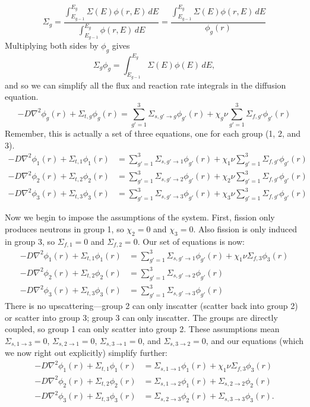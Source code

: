 \documentclass{report}
\begin{document}
\begin{enumerate}[a)]
$$ \Sigma_g = \frac{\int_{E_{g-1}}^{E_g} \Sigma(E)\phi(r,E)\,dE}{\int_{E_{g-1}}^{E_g} \phi(r,E)\,dE} = \frac{\int_{E_{g-1}}^{E_g} \Sigma(E)\phi(r,E)\,dE}{\phi_g(r)} $$
Multiplying both sides by $\phi_g$ gives
$$ \Sigma_g \phi_g = \int_{E_{g-1}}^{E_g} \Sigma(E)\phi(E)\,dE ,$$
and so we can simplify all the flux and reaction rate integrals in the diffusion equation.
$$ -D \nabla^2 \phi_g(r) + \Sigma_{t,g} \phi_g(r) = \sum_{g'=1}^3 \Sigma_{s,g' \rightarrow g}\phi_{g'}(r) + \chi_g \nu \sum_{g'=1}^3 \Sigma_{f,g'}\phi_{g'}(r) $$
Remember, this is actually a set of three equations, one for each group (1, 2, and 3).
\begin{align*}
-D \nabla^2 \phi_1(r) + \Sigma_{t,1} \phi_1(r) &= \sum_{g'=1}^3 \Sigma_{s,g' \rightarrow 1}\phi_{g'}(r) + \chi_1 \nu \sum_{g'=1}^3 \Sigma_{f,g'}\phi_{g'}(r) \\
-D \nabla^2 \phi_2(r) + \Sigma_{t,2} \phi_2(r) &= \sum_{g'=1}^3 \Sigma_{s,g' \rightarrow 2}\phi_{g'}(r) + \chi_2 \nu \sum_{g'=1}^3 \Sigma_{f,g'}\phi_{g'}(r) \\
-D \nabla^2 \phi_3(r) + \Sigma_{t,3} \phi_3(r) &= \sum_{g'=1}^3 \Sigma_{s,g' \rightarrow 3}\phi_{g'}(r) + \chi_3 \nu \sum_{g'=1}^3 \Sigma_{f,g'}\phi_{g'}(r)
\end{align*}

Now we begin to impose the assumptions of the system. First, fission only produces neutrons in group 1, so $\chi_2 = 0$ and $\chi_3 = 0$. Also fission is only induced in group 3, so $\Sigma_{f,1} = 0$ and $\Sigma_{f,2} = 0$. Our set of equations is now:
\begin{align*}
-D \nabla^2 \phi_1(r) + \Sigma_{t,1} \phi_1(r) &= \sum_{g'=1}^3 \Sigma_{s,g' \rightarrow 1}\phi_{g'}(r) + \chi_1 \nu \Sigma_{f,3}\phi_{3}(r) \\
-D \nabla^2 \phi_2(r) + \Sigma_{t,2} \phi_2(r) &= \sum_{g'=1}^3 \Sigma_{s,g' \rightarrow 2}\phi_{g'}(r) \\
-D \nabla^2 \phi_3(r) + \Sigma_{t,3} \phi_3(r) &= \sum_{g'=1}^3 \Sigma_{s,g' \rightarrow 3}\phi_{g'}(r) 
\end{align*}
There is no upscattering---group 2 can only inscatter (scatter back into group 2) or scatter into group 3; group 3 can only inscatter. The groups are directly coupled, so group 1 can only scatter into group 2. These assumptions mean $\Sigma_{s,1 \rightarrow 3} = 0$, $\Sigma_{s,2 \rightarrow 1} = 0$, $\Sigma_{s,3 \rightarrow 1} = 0$, and $\Sigma_{s,3 \rightarrow 2} = 0$, and our equations (which we now right out explicitly) simplify further:
\begin{align*}
-D \nabla^2 \phi_1(r) + \Sigma_{t,1} \phi_1(r) &= \Sigma_{s,1 \rightarrow 1}\phi_1(r) + \chi_1 \nu \Sigma_{f,3}\phi_{3}(r) \\
-D \nabla^2 \phi_2(r) + \Sigma_{t,2} \phi_2(r) &= \Sigma_{s,1 \rightarrow 2}\phi_1(r) +\Sigma_{s,2 \rightarrow 2}\phi_2(r) \\
-D \nabla^2 \phi_3(r) + \Sigma_{t,3} \phi_3(r) &= \Sigma_{s,2 \rightarrow 3}\phi_{2}(r) + \Sigma_{s,3 \rightarrow 3}\phi_{3}(r).\\
\end{align*}


\end{enumerate}
\end{document}
